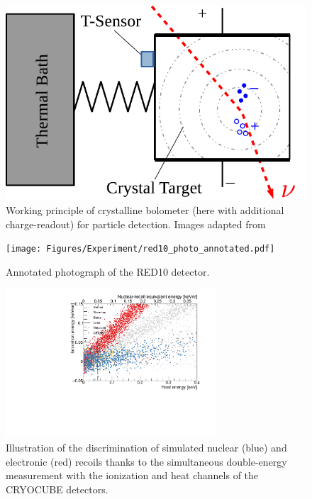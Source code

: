 \begin{figure}
\centering
\includegraphics[scale=1]{Figures/Experiment/crystalline_detector_principle.pdf}
\caption{Working principle of crystalline bolometer (here with additional charge-readout) for particle detection. Images adapted from ~\cite{Schumann:2019eaa}}
\label{fig:crystalline}
\end{figure}

\begin{figure}
\centering
\texttt{[image: Figures/Experiment/red10\_photo\_annotated.pdf]}
\caption{Annotated photograph of the RED10 detector.}
\label{photo}
\end{figure}


\begin{figure}
\centering
\includegraphics [width=0.7\textwidth]{Figures/Experiment/discrimination_simulation.pdf}
\caption{
Illustration of the discrimination of simulated nuclear (blue) and electronic (red) recoils thanks to the simultaneous double-energy measurement with the ionization and heat channels  of the CRYOCUBE detectors.
}
\label{photo}
\end{figure}

